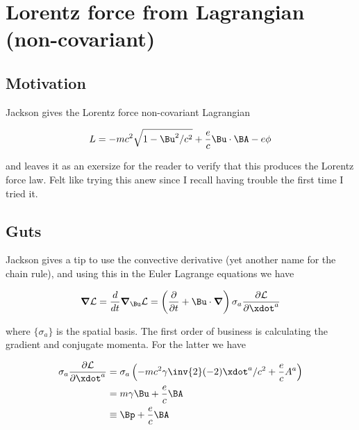 

\chapter{Lorentz force from Lagrangian (non-covariant)}
\label{chap:jackson12Dash9}
{}
\date{Sept 22, 2009}

\beginArtNoToc

\section{Motivation}

Jackson \cite{jackson1975cew} gives the Lorentz force non-covariant Lagrangian 

\begin{align}\label{eqn:jacksonLorLag:foo1}
L = - m c^2 \sqrt{1 -\Bu^2/c^2} + \frac{e}{c} \Bu \cdot \BA - e \phi
\end{align}

and leaves it as an exersize for the reader to verify that this produces the Lorentz force law.  Felt like trying this anew since I recall having trouble the first time I tried it.

\section{Guts}

Jackson gives a tip to use the convective derivative (yet another name for the chain rule), and using this in the Euler Lagrange equations we have

\begin{align}\label{eqn:jacksonLorLag:foo2}
\spacegrad \LL = \frac{d}{dt} \spacegrad_\Bu \LL = \left( \frac{\partial}{\partial t} + \Bu \cdot \spacegrad \right) \sigma_a \frac{\partial \LL}{\partial \xdot^a}
\end{align}

where $\{\sigma_a\}$ is the spatial basis.  The first order of business is calculating the gradient and conjugate momenta.  For the latter we have

\begin{align*}
\sigma_a \frac{\partial \LL}{\partial \xdot^a}
&=
\sigma_a \left(- m c^2 \gamma \inv{2} (-2) \xdot^a/c^2 + \frac{e}{c} A^a \right) \\
&=
m \gamma \Bu + \frac{e}{c} \BA \\
&\equiv \Bp + \frac{e}{c}\BA
\end{align*}

